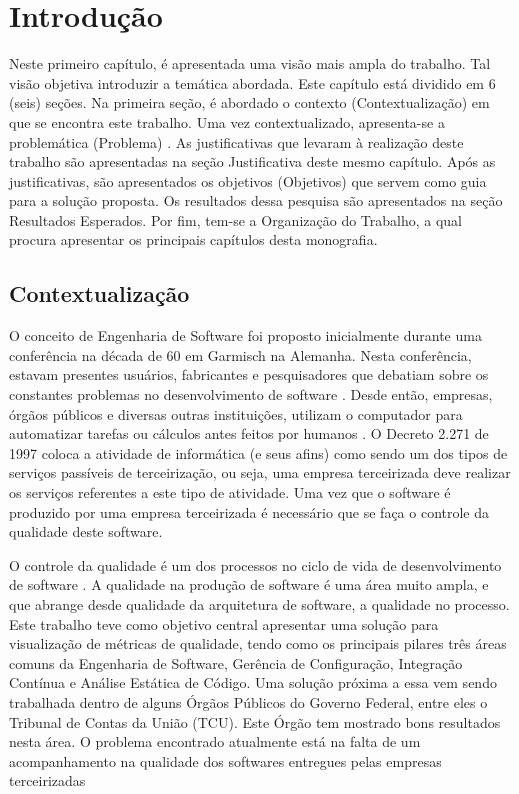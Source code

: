 \chapter[Introdução]{Introdução}
	Neste primeiro capítulo, é apresentada uma visão mais ampla do trabalho. Tal visão objetiva introduzir a temática abordada. Este capítulo está dividido em 6 (seis) seções. Na primeira seção, é abordado o contexto (Contextualização) em que se encontra este trabalho. Uma vez contextualizado, apresenta-se a problemática (Problema) . As justificativas que levaram à realização deste trabalho são apresentadas na seção Justificativa deste mesmo capítulo. Após as justificativas, são apresentados os objetivos (Objetivos) que servem como guia para a solução proposta. Os resultados dessa pesquisa  são apresentados na seção Resultados Esperados. Por fim, tem-se a Organização do Trabalho, a qual procura apresentar os principais capítulos desta monografia.


\section{Contextualização}
	O conceito de Engenharia de Software foi proposto inicialmente durante uma conferência na década de 60 em Garmisch na Alemanha. Nesta conferência, estavam presentes usuários, fabricantes e pesquisadores que debatiam sobre os constantes problemas no desenvolvimento de software \cite{Paduelli}. Desde então, empresas, órgãos públicos e diversas outras instituições, utilizam o computador para automatizar tarefas ou cálculos antes feitos por humanos \cite{fonseca2007historia}. O Decreto 2.271 de 1997 \cite{decreto_2271} coloca a atividade de informática (e seus afins) como sendo um dos tipos de serviços passíveis de terceirização, ou seja, uma empresa terceirizada deve realizar os serviços referentes a este tipo de atividade. Uma vez que o software é produzido por uma empresa terceirizada é necessário que se faça o controle da qualidade deste software.

O controle da qualidade é um dos processos no ciclo de vida de desenvolvimento de software \cite{machado_metricas_2004}. A qualidade na produção de software é uma área muito ampla, e que abrange desde qualidade da arquitetura de software, a qualidade no processo. Este trabalho teve como objetivo central apresentar uma solução para visualização de métricas de qualidade, tendo como os principais pilares três áreas comuns da Engenharia de Software, Gerência de Configuração, Integração Contínua e Análise Estática de Código. Uma solução próxima a essa vem sendo trabalhada dentro de alguns Órgãos Públicos do Governo Federal, entre eles o Tribunal de Contas da União (TCU). Este Órgão tem mostrado bons resultados nesta área. O problema encontrado atualmente está na falta de um acompanhamento na qualidade dos softwares entregues pelas empresas terceirizadas 	

